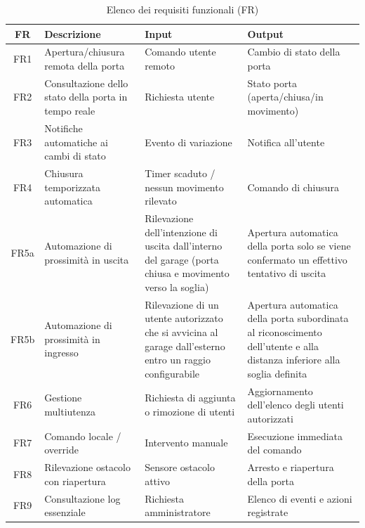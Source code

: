 \begin{table}[h!]
\centering
\caption{Elenco dei requisiti funzionali (FR)}
\label{tab:fr}
\begin{tabularx}{\textwidth}{@{}cX X X@{}}
\toprule
\textbf{FR} & \textbf{Descrizione} & \textbf{Input} & \textbf{Output} \\
\midrule
FR1 & Apertura/chiusura remota della porta & Comando utente remoto & Cambio di stato della porta \\

FR2 & Consultazione dello stato della porta in tempo reale & Richiesta utente & Stato porta (aperta/chiusa/in movimento) \\

FR3 & Notifiche automatiche ai cambi di stato & Evento di variazione & Notifica all’utente \\

FR4 & Chiusura temporizzata automatica & Timer scaduto / nessun movimento rilevato & Comando di chiusura \\

FR5a & Automazione di prossimità in uscita &
Rilevazione dell’intenzione di uscita dall’interno del garage (porta chiusa e movimento verso la soglia) &
Apertura automatica della porta solo se viene confermato un effettivo tentativo di uscita \\

FR5b & Automazione di prossimità in ingresso &
Rilevazione di un utente autorizzato che si avvicina al garage dall’esterno entro un raggio configurabile &
Apertura automatica della porta subordinata al riconoscimento dell’utente e alla distanza inferiore alla soglia definita \\

FR6 & Gestione multiutenza &
Richiesta di aggiunta o rimozione di utenti &
Aggiornamento dell’elenco degli utenti autorizzati \\

FR7 & Comando locale / override &
Intervento manuale &
Esecuzione immediata del comando \\

FR8 & Rilevazione ostacolo con riapertura &
Sensore ostacolo attivo &
Arresto e riapertura della porta \\

FR9 & Consultazione log essenziale &
Richiesta amministratore &
Elenco di eventi e azioni registrate \\
\bottomrule
\end{tabularx}
\end{table}

